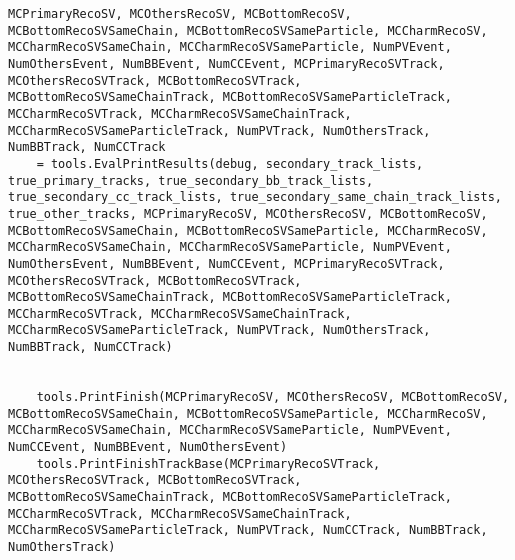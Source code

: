 \begin{lstlisting}[caption=崩壊点検出アルゴリズム, label=VertexFinder2]
        MCPrimaryRecoSV, MCOthersRecoSV, MCBottomRecoSV, MCBottomRecoSVSameChain, MCBottomRecoSVSameParticle, MCCharmRecoSV, MCCharmRecoSVSameChain, MCCharmRecoSVSameParticle, NumPVEvent, NumOthersEvent, NumBBEvent, NumCCEvent, MCPrimaryRecoSVTrack, MCOthersRecoSVTrack, MCBottomRecoSVTrack, MCBottomRecoSVSameChainTrack, MCBottomRecoSVSameParticleTrack, MCCharmRecoSVTrack, MCCharmRecoSVSameChainTrack, MCCharmRecoSVSameParticleTrack, NumPVTrack, NumOthersTrack, NumBBTrack, NumCCTrack
	= tools.EvalPrintResults(debug, secondary_track_lists, true_primary_tracks, true_secondary_bb_track_lists, true_secondary_cc_track_lists, true_secondary_same_chain_track_lists, true_other_tracks, MCPrimaryRecoSV, MCOthersRecoSV, MCBottomRecoSV, MCBottomRecoSVSameChain, MCBottomRecoSVSameParticle, MCCharmRecoSV, MCCharmRecoSVSameChain, MCCharmRecoSVSameParticle, NumPVEvent, NumOthersEvent, NumBBEvent, NumCCEvent, MCPrimaryRecoSVTrack, MCOthersRecoSVTrack, MCBottomRecoSVTrack, MCBottomRecoSVSameChainTrack, MCBottomRecoSVSameParticleTrack, MCCharmRecoSVTrack, MCCharmRecoSVSameChainTrack, MCCharmRecoSVSameParticleTrack, NumPVTrack, NumOthersTrack, NumBBTrack, NumCCTrack)


    tools.PrintFinish(MCPrimaryRecoSV, MCOthersRecoSV, MCBottomRecoSV, MCBottomRecoSVSameChain, MCBottomRecoSVSameParticle, MCCharmRecoSV, MCCharmRecoSVSameChain, MCCharmRecoSVSameParticle, NumPVEvent, NumCCEvent, NumBBEvent, NumOthersEvent)
    tools.PrintFinishTrackBase(MCPrimaryRecoSVTrack, MCOthersRecoSVTrack, MCBottomRecoSVTrack, MCBottomRecoSVSameChainTrack, MCBottomRecoSVSameParticleTrack, MCCharmRecoSVTrack, MCCharmRecoSVSameChainTrack, MCCharmRecoSVSameParticleTrack, NumPVTrack, NumCCTrack, NumBBTrack, NumOthersTrack)
\end{lstlisting}
    
    
    
    
    
    
    
    
    
    
    
    
    
    